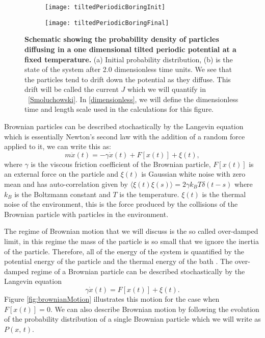 \begin{figure}[tb]
	\begin{subfigure}{0.49\textwidth}
		\texttt{[image: tiltedPeriodicBoringInit]}
		\caption{\label{fig:Init}}
	\end{subfigure}
\begin{subfigure}{0.49\textwidth}
		\texttt{[image: tiltedPeriodicBoringFinal]}
		\caption{\label{fig:Final}}
\end{subfigure}
\caption{\textbf{Schematic showing the probability density of particles diffusing in a one dimensional tilted periodic potential at a fixed temperature.} (a) Initial probability distribution, (b) is the state of the system after 2.0 dimensionless time units. We see that the particles tend to drift down the potential as they diffuse. This drift will be called the current $J$ which we will quantify in ~\autoref{Smoluchowski}. In \autoref{dimensionless}, we will define the dimensionless time and length scale used in the calculations for this figure.}
\label{fig:Schematic}
\end{figure}

Brownian particles can be described stochastically by the Langevin equation which is essentially Newton's second law with the addition of a random force applied to it, we can write this as:
\begin{equation}
m \ddot{x}(t) = -\gamma \dot{x} (t) + F[x(t)] + \xi(t), 
\end{equation}
where $\gamma$ is the viscous friction coefficient of the Brownian particle, $F[x(t)]$ is an external force on the particle and $\xi(t)$ is Gaussian white noise with zero mean and has auto-correlation given by $\langle \xi(t) \xi(s) \rangle = 2 \gamma k_B T \delta(t - s)$ where $k_B$ is the Boltzmann constant and $T$ is the temperature. $\xi(t)$ is the thermal noise of the environment, this is the force produced by the collisions of the Brownian particle with particles in the environment.

The regime of Brownian motion that we will discuss is the so called over-damped limit, in this regime the mass of the particle is so small that we ignore the inertia of the particle. Therefore, all of the energy of the system is quantified by the potential energy of the particle and the thermal energy of the bath \cite{Streater1997,Streater1997a,Streater2000,Streater1997b}. The over-damped regime of a Brownian particle can be described stochastically by the Langevin equation 
\begin{equation}
	\gamma \dot x(t) = F[x(t)] + \xi(t).  \label{eqn:langevin}
\end{equation}
Figure \ref{fig:brownianMotion} illustrates this motion for the case when $F[x(t)] = 0$. We can also describe Brownian motion by following the evolution of the probability distribution of a single Brownian particle which we will write as $P(x, \, t)$.

